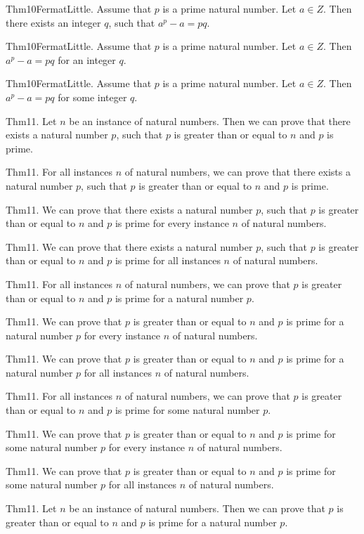 \documentclass{article}
\begin{document}
Thm10FermatLittle. Assume that $p$ is a prime natural number. Let $a \in Z$. Then there exists an integer $q$, such that $a ^ {p}- a = p q$.

Thm10FermatLittle. Assume that $p$ is a prime natural number. Let $a \in Z$. Then $a ^ {p}- a = p q$ for an integer $q$.

Thm10FermatLittle. Assume that $p$ is a prime natural number. Let $a \in Z$. Then $a ^ {p}- a = p q$ for some integer $q$.

Thm11. Let $n$ be an instance of natural numbers. Then we can prove that there exists a natural number $p$, such that $p$ is greater than or equal to $n$ and $p$ is prime.

Thm11. For all instances $n$ of natural numbers, we can prove that there exists a natural number $p$, such that $p$ is greater than or equal to $n$ and $p$ is prime.

Thm11. We can prove that there exists a natural number $p$, such that $p$ is greater than or equal to $n$ and $p$ is prime for every instance $n$ of natural numbers.

Thm11. We can prove that there exists a natural number $p$, such that $p$ is greater than or equal to $n$ and $p$ is prime for all instances $n$ of natural numbers.

Thm11. For all instances $n$ of natural numbers, we can prove that $p$ is greater than or equal to $n$ and $p$ is prime for a natural number $p$.

Thm11. We can prove that $p$ is greater than or equal to $n$ and $p$ is prime for a natural number $p$ for every instance $n$ of natural numbers.

Thm11. We can prove that $p$ is greater than or equal to $n$ and $p$ is prime for a natural number $p$ for all instances $n$ of natural numbers.

Thm11. For all instances $n$ of natural numbers, we can prove that $p$ is greater than or equal to $n$ and $p$ is prime for some natural number $p$.

Thm11. We can prove that $p$ is greater than or equal to $n$ and $p$ is prime for some natural number $p$ for every instance $n$ of natural numbers.

Thm11. We can prove that $p$ is greater than or equal to $n$ and $p$ is prime for some natural number $p$ for all instances $n$ of natural numbers.

Thm11. Let $n$ be an instance of natural numbers. Then we can prove that $p$ is greater than or equal to $n$ and $p$ is prime for a natural number $p$.
\end{document}
